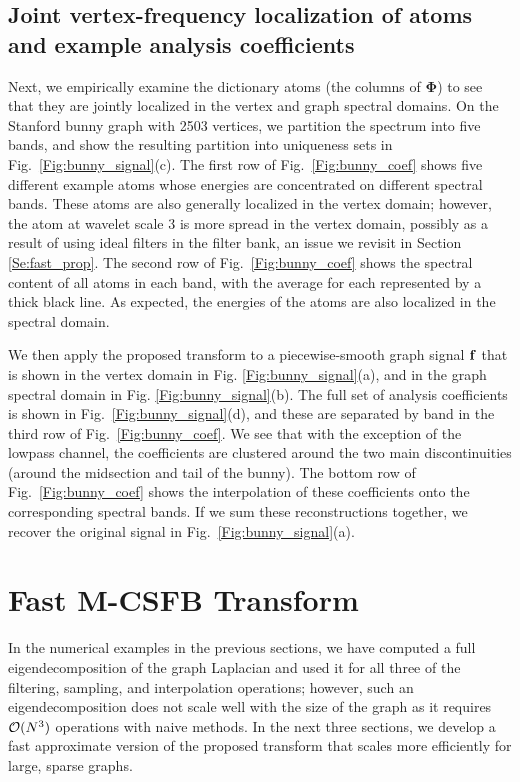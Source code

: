 \documentclass[journal, 10pt]{IEEEtran}
\begin{document}
\subsection{Joint vertex-frequency localization of atoms and example analysis coefficients} \label{Se:ill1}
Next, we empirically examine the dictionary atoms (the columns of $\boldsymbol{\Phi}$) to see that they are jointly localized in the vertex and graph spectral domains. On the Stanford bunny graph \cite{bunny} with 2503 vertices, we partition the spectrum into five bands, and show the resulting partition into uniqueness sets 
in Fig.\ \ref{Fig:bunny_signal}(c). The first row of Fig.\ \ref{Fig:bunny_coef} shows five different example atoms whose energies are concentrated on different spectral bands. %
These atoms are also generally localized in the vertex domain; however,  %
the atom at wavelet scale 3 %
is more spread in the vertex domain, possibly as a result of using ideal filters in the filter bank, an issue we revisit in Section \ref{Se:fast_prop}. The second row of Fig.\ \ref{Fig:bunny_coef} shows the spectral content of all atoms in each band, with the average for each represented by a thick black line. As expected, the energies of the atoms are also localized in the spectral domain. %

We then apply the proposed transform to a piecewise-smooth graph signal ${\bf f}$ that is shown in the vertex domain in Fig. \ref{Fig:bunny_signal}(a), and in the graph spectral domain in Fig. \ref{Fig:bunny_signal}(b). The full set of analysis coefficients is shown in Fig.\ \ref{Fig:bunny_signal}(d), and these are separated by band in the third row of Fig.\ \ref{Fig:bunny_coef}. We see that with the exception of the lowpass channel, the coefficients are clustered around the two main discontinuities (around the midsection and tail of the bunny). The bottom row of Fig.\ \ref{Fig:bunny_coef} shows the interpolation of these coefficients onto the corresponding spectral bands. If we sum these reconstructions together, we recover %
 the original signal in Fig.\ \ref{Fig:bunny_signal}(a).



\section{Fast M-CSFB Transform} \label{Se:fast_mcsfb}
In the numerical examples in the previous sections, we have computed a full eigendecomposition of the graph Laplacian and %
used it for all three of the filtering, sampling, and interpolation operations; however, such an eigendecomposition does not scale well with the size of the graph as it requires ${\cal O}(N^3)$ operations with naive methods. 
In %
the next three sections, we develop a fast approximate version of the proposed transform that scales more efficiently for large, sparse graphs. 
\end{document}

